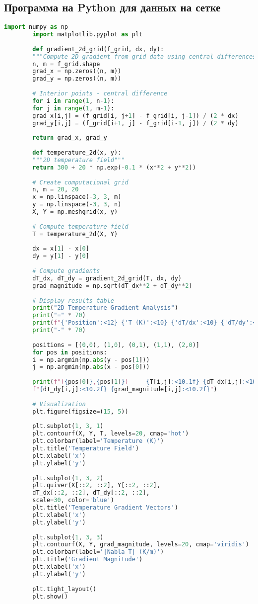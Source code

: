 \documentclass[12pt]{article}
\begin{document}
	\subsection{Программа на Python для данных на сетке}
	
	\begin{lstlisting}[language=Python, caption=2D gradient from grid data (Python)]
		import numpy as np
		import matplotlib.pyplot as plt
		
		def gradient_2d_grid(f_grid, dx, dy):
		"""Compute 2D gradient from grid data using central differences"""
		n, m = f_grid.shape
		grad_x = np.zeros((n, m))
		grad_y = np.zeros((n, m))
		
		# Interior points - central difference
		for i in range(1, n-1):
		for j in range(1, m-1):
		grad_x[i,j] = (f_grid[i, j+1] - f_grid[i, j-1]) / (2 * dx)
		grad_y[i,j] = (f_grid[i+1, j] - f_grid[i-1, j]) / (2 * dy)
		
		return grad_x, grad_y
		
		def temperature_2d(x, y):
		"""2D temperature field"""
		return 300 + 20 * np.exp(-0.1 * (x**2 + y**2))
		
		# Create computational grid
		n, m = 20, 20
		x = np.linspace(-3, 3, m)
		y = np.linspace(-3, 3, n)
		X, Y = np.meshgrid(x, y)
		
		# Compute temperature field
		T = temperature_2d(X, Y)
		
		dx = x[1] - x[0]
		dy = y[1] - y[0]
		
		# Compute gradients
		dT_dx, dT_dy = gradient_2d_grid(T, dx, dy)
		grad_magnitude = np.sqrt(dT_dx**2 + dT_dy**2)
		
		# Display results table
		print("2D Temperature Gradient Analysis")
		print("=" * 70)
		print(f"{'Position':<12} {'T (K)':<10} {'dT/dx':<10} {'dT/dy':<10} {'|nabla T|':<10}")
		print("-" * 70)
		
		positions = [(0,0), (1,0), (0,1), (1,1), (2,0)]
		for pos in positions:
		i = np.argmin(np.abs(y - pos[1]))
		j = np.argmin(np.abs(x - pos[0]))
		
		print(f"({pos[0]},{pos[1]})     {T[i,j]:<10.1f} {dT_dx[i,j]:<10.2f} "
		f"{dT_dy[i,j]:<10.2f} {grad_magnitude[i,j]:<10.2f}")
		
		# Visualization
		plt.figure(figsize=(15, 5))
		
		plt.subplot(1, 3, 1)
		plt.contourf(X, Y, T, levels=20, cmap='hot')
		plt.colorbar(label='Temperature (K)')
		plt.title('Temperature Field')
		plt.xlabel('x')
		plt.ylabel('y')
		
		plt.subplot(1, 3, 2)
		plt.quiver(X[::2, ::2], Y[::2, ::2], 
		dT_dx[::2, ::2], dT_dy[::2, ::2], 
		scale=30, color='blue')
		plt.title('Temperature Gradient Vectors')
		plt.xlabel('x')
		plt.ylabel('y')
		
		plt.subplot(1, 3, 3)
		plt.contourf(X, Y, grad_magnitude, levels=20, cmap='viridis')
		plt.colorbar(label='|Nabla T| (K/m)')
		plt.title('Gradient Magnitude')
		plt.xlabel('x')
		plt.ylabel('y')
		
		plt.tight_layout()
		plt.show()
	\end{lstlisting}
	
\end{document}
